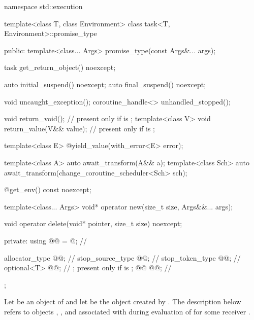\begin{codeblock}
namespace std::execution {
  template<class T, class Environment>
  class task<T, Environment>::promise_type {
  public:
    template<class... Args>
      promise_type(const Args&... args);

    task get_return_object() noexcept;

    auto initial_suspend() noexcept;
    auto final_suspend() noexcept;

    void uncaught_exception();
    coroutine_handle<> unhandled_stopped();

    void return_void();                 // present only if  is ;
    template<class V>
      void return_value(V&& value);     // present only if  is ;

    template<class E>
      @\unspec@ yield_value(with_error<E> error);

    template<class A>
      auto await_transform(A&& a);
    template<class Sch>
      auto await_transform(change_coroutine_scheduler<Sch> sch);

    @\unspec@ get_env() const noexcept;

    template<class... Args>
      void* operator new(size_t size, Args&&... args);

    void operator delete(void* pointer, size_t size) noexcept;

  private:
    using @@ = @\seebelownc@;    // \expos

    allocator_type    @@;            // \expos
    stop_source_type  @@;           // \expos
    stop_token_type   @@;            // \expos
    optional<T>       @@;           // \expos; present only if  is ;
    @@     @@;           // \expos
  };
}
\end{codeblock}

\pnum
Let  be an object of 
and let  be the  object
created by .
The description below
refers to objects ,
,
and 
associated with 
during evaluation of 
for some receiver .

